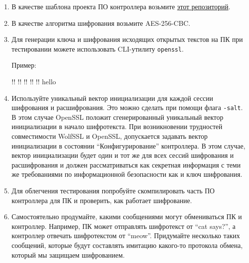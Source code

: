 \documentclass[14pt]{extarticle}
\begin{document}
\begin{enumerate}

 \item В качестве шаблона проекта ПО контроллера возьмите
  \href{https://github.com/czertyaka/blackpill-usb-sha256}{этот репозиторий}.

 \item В качестве алгоритма шифрования возьмите AES-256-CBC.

 \item Для генерации ключа и шифрования исходящих открытых текстов на ПК при
  тестировании можете использовать CLI-утилиту \texttt{openssl}\footnotemark{}.


  Пример:
  \begin{terminalwindow}
!!
!!
!!
!!
!!
hello
  \end{terminalwindow}

 \item Используйте уникальный вектор инициализации для каждой сессии шифрования
  и расшифрования.
  Это можно сделать при помощи флага \texttt{-salt}.
  В этом случае OpenSSL положит сгенерированный уникальный вектор инициализации
  в начало шифротекста.
  При возникновении трудностей совместимости WolfSSL и OpenSSL, допускается
  задавать вектор инициализации в состоянии ``Конфигурирование'' контроллера.
  В этом случае, вектор инициализации будет один и тот же для всех сессий шифрования
  и расшифрования и должен рассматриваться как секретная информация с теми же
  требованиями по информационной безопасности как и ключ шифрования.

 \item Для облегчения тестирования попробуйте скомпилировать часть ПО контроллера
  для ПК и проверить, как работает шифрование.

 \item Самостоятельно продумайте, какими сообщениями могут обмениваться ПК и
  контроллер.
  Например, ПК может отправлять шифротекст от ``cat says?'', а контроллер отвечать
  шифротекстом от ``meow''.
  Придумайте несколько таких сообщений, которые будут составлять имитацию
  какого-то протокола обмена, который мы защищаем шифрованием.

\end{enumerate}
\end{document}
